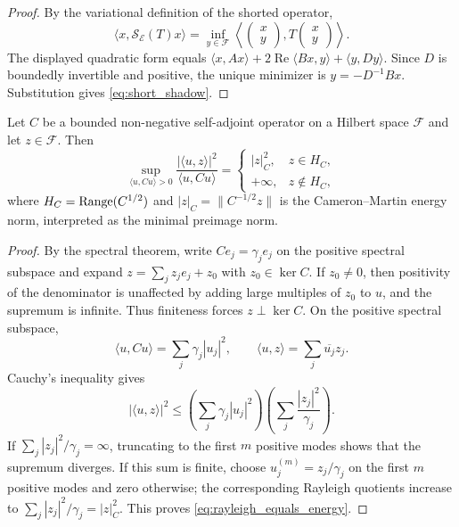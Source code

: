 \begin{proof}
By the variational definition of the shorted operator,
\[
  \langle x,\mathcal{S}_{\mathcal{E}}(T)x\rangle
  =
  \inf_{y\in\mathcal{F}}
  \left\langle
  \begin{pmatrix}x\\y\end{pmatrix},
  T
  \begin{pmatrix}x\\y\end{pmatrix}
  \right\rangle .
\]
The displayed quadratic form equals
$\langle x,Ax\rangle+2\operatorname{Re}\langle Bx,y\rangle+
\langle y,Dy\rangle$.  Since $D$ is boundedly invertible and positive, the unique
minimizer is $y=-D^{-1}Bx$.  Substitution gives \eqref{eq:short_shadow}.
\end{proof}

\begin{lemma}
\label{lem:rayleigh_covariance_energy}
Let $C$ be a bounded non-negative self-adjoint operator on a Hilbert space
$\mathcal{F}$ and let $z\in\mathcal{F}$.  Then
\begin{equation}
  \sup_{\langle u,Cu\rangle>0}
  \frac{|\langle u,z\rangle|^2}{\langle u,Cu\rangle}
  =
  \begin{cases}
    |z|_C^2, & z\in H_C,\\
    +\infty, & z\notin H_C,
  \end{cases}
  \label{eq:rayleigh_equals_energy}
\end{equation}
where $H_C=\operatorname{Range}(C^{1/2})$ and $|z|_C=\|C^{-1/2}z\|$ is the
Cameron--Martin energy norm, interpreted as the minimal preimage norm.
\end{lemma}

\begin{proof}
By the spectral theorem, write $C e_j=\gamma_j e_j$ on the positive spectral
subspace and expand $z=\sum_j z_j e_j+z_0$ with $z_0\in\ker C$.  If $z_0\ne0$,
then positivity of the denominator is unaffected by adding large multiples of
$z_0$ to $u$, and the supremum is infinite.  Thus finiteness forces
$z\perp\ker C$.  On the positive spectral subspace,
\[
  \langle u,Cu\rangle=\sum_j\gamma_j|u_j|^2,
  \qquad
  \langle u,z\rangle=\sum_j\overline{u_j}z_j.
\]
Cauchy's inequality gives
\[
  |\langle u,z\rangle|^2
  \le
  \left(\sum_j\gamma_j|u_j|^2\right)
  \left(\sum_j\frac{|z_j|^2}{\gamma_j}\right).
\]
If $\sum_j|z_j|^2/\gamma_j=\infty$, truncating to the first $m$ positive modes
shows that the supremum diverges.  If this sum is finite, choose
$u_j^{(m)}=z_j/\gamma_j$ on the first $m$ positive modes and zero otherwise;
the corresponding Rayleigh quotients increase to
$\sum_j|z_j|^2/\gamma_j=|z|_C^2$.  This proves
\eqref{eq:rayleigh_equals_energy}.
\end{proof}

